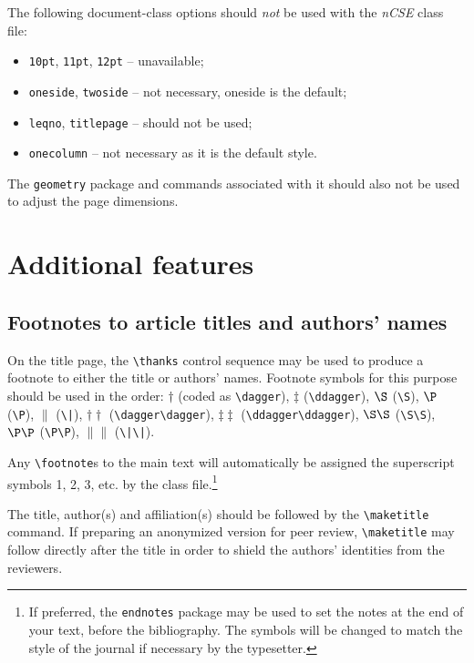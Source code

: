 \documentclass{nCSE2e}
\begin{document}
The following document-class options should \emph{not} be used with the {\it nCSE} class file:
%
\begin{itemize}
   \item {\tt 10pt}, {\tt 11pt}, {\tt 12pt} -- unavailable;
   \item {\tt oneside}, {\tt twoside} -- not necessary, oneside is the default;
   \item {\tt leqno}, {\tt titlepage} -- should not be used;
   \item {\tt onecolumn} -- not necessary as it is the default style.
\end{itemize}
%
The {\tt geometry} package and commands associated with it should also not be used to adjust the page dimensions.


\section{Additional features}

\subsection{Footnotes to article titles and authors' names}

On the title page, the \verb"\thanks" control sequence may be used to produce a footnote to either the title or authors' names. Footnote symbols for this purpose should be used in the order:
$\dagger$ (coded as \verb"\dagger"), $\ddagger$ (\verb"\ddagger"), $\S$ (\verb"\S"), $\P$ (\verb"\P"), $\|$ (\verb"\|"),\break
$\dagger\dagger$ (\verb"\dagger\dagger"), $\ddagger\ddagger$ (\verb"\ddagger\ddagger"), $\S\S$ (\verb"\S\S"), $\P\P$ (\verb"\P\P"), $\|\|$ (\verb"\|\|").

Any \verb"\footnote"s to the main text will automatically be assigned the superscript
 symbols 1, 2, 3, etc. by the class file.\footnote{If preferred, the \texttt{endnotes} package
 may be used to set the notes at the end of your text, before the bibliography.
 The symbols will be changed to match the style of the journal if necessary by the typesetter.}

The title, author(s) and affiliation(s) should be followed by the {\verb"\maketitle"} command. If preparing an anonymized version for peer review, {\verb"\maketitle"} may follow directly after the title in order to shield the authors' identities from the reviewers.
\end{document}
